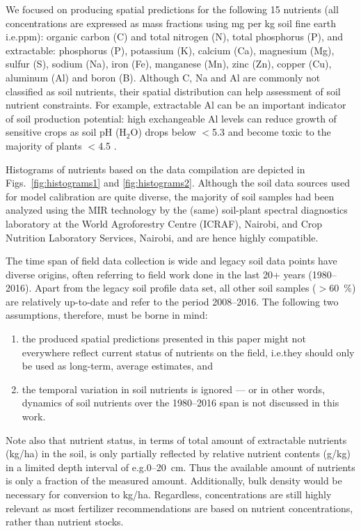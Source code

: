 \begin{linenumbers}
We focused on producing spatial predictions for the following 15 nutrients (all concentrations are expressed as mass fractions using \si{\milli\gram} per \si{\kilo\gram} soil fine earth i.e.\@ ppm): organic carbon (C) and total nitrogen (N), total phosphorus (P), and extractable: phosphorus (P), potassium (K), calcium (Ca), magnesium (Mg), sulfur (S), sodium (Na), iron (Fe), manganese (Mn), zinc (Zn), copper (Cu), aluminum (Al) and boron (B). Although C, Na and Al are commonly not classified as soil nutrients, their spatial distribution can help assessment of soil nutrient constraints. For example, extractable Al can be an important indicator of soil production potential: high exchangeable Al levels can reduce growth of sensitive crops as soil pH (H$_2$O) drops below $<$5.3 and become toxic to the majority of plants $<$4.5 \citep{white2009principles}. \par

Histograms of nutrients based on the data compilation are depicted in Figs.\@~\ref{fig:histograms1} and \ref{fig:histograms2}. Although the soil data sources used for model calibration are quite diverse, the majority of soil samples had been analyzed using the MIR technology by the (same) soil-plant spectral diagnostics laboratory at the World Agroforestry Centre (ICRAF), Nairobi, and Crop Nutrition Laboratory Services, Nairobi, and are hence highly compatible. \par

The time span of field data collection is wide and legacy soil data points have diverse origins, often referring to field work done in the last 20+ years (1980--2016). Apart from the legacy soil profile data set, all other soil samples ($>$\SI{60}{\percent}) are relatively up-to-date and refer to the period 2008--2016. The following two assumptions, therefore, must be borne in mind: 

\begin{enumerate}\renewcommand{\labelenumi}{(\alph{enumi})}
\item the produced spatial predictions presented in this paper might not everywhere reflect current status of nutrients on the field, i.e.\@ they should only be used as long-term, average estimates, and
\item the temporal variation in soil nutrients is ignored --- or in other words, dynamics of soil nutrients over the 1980--2016 span is not discussed in this work.
\end{enumerate}

Note also that nutrient status, in terms of total amount of extractable nutrients (kg/ha) in the soil, is only partially reflected by relative nutrient contents (g/kg) in a limited depth interval of e.g.\@ 0--\SI{20}{\centi\metre}. Thus the available amount of nutrients is only a fraction of the measured amount. Additionally, bulk density would be necessary for conversion to kg/ha. Regardless, concentrations are still highly relevant as most fertilizer recommendations are based on nutrient concentrations, rather than nutrient stocks. \par


\end{linenumbers}
